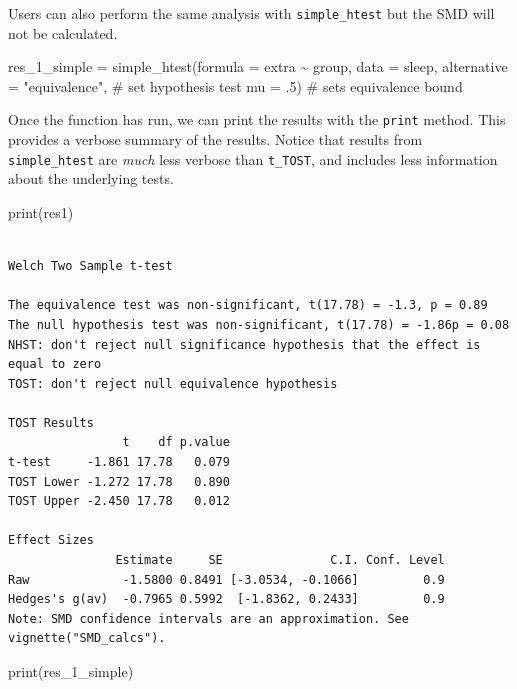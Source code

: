 \documentclass[
]{interact}
\newenvironment{Shaded}{\begin{snugshade}}{\end{snugshade}}
\newcommand{\AttributeTok}[1]{\textcolor[rgb]{0.40,0.45,0.13}{#1}}
\newcommand{\CommentTok}[1]{\textcolor[rgb]{0.37,0.37,0.37}{#1}}
\newcommand{\DecValTok}[1]{\textcolor[rgb]{0.68,0.00,0.00}{#1}}
\newcommand{\FunctionTok}[1]{\textcolor[rgb]{0.28,0.35,0.67}{#1}}
\newcommand{\NormalTok}[1]{\textcolor[rgb]{0.00,0.23,0.31}{#1}}
\newcommand{\OtherTok}[1]{\textcolor[rgb]{0.00,0.23,0.31}{#1}}
\newcommand{\SpecialCharTok}[1]{\textcolor[rgb]{0.37,0.37,0.37}{#1}}
\newcommand{\StringTok}[1]{\textcolor[rgb]{0.13,0.47,0.30}{#1}}
\begin{document}
Users can also perform the same analysis with \texttt{simple\_htest} but
the SMD will not be calculated.

\begin{Shaded}
\begin{Highlighting}[]
\NormalTok{res\_1\_simple }\OtherTok{=} \FunctionTok{simple\_htest}\NormalTok{(}\AttributeTok{formula =}\NormalTok{ extra }\SpecialCharTok{\textasciitilde{}}\NormalTok{ group, }
                            \AttributeTok{data =}\NormalTok{ sleep, }
                            \AttributeTok{alternative =} \StringTok{"equivalence"}\NormalTok{, }\CommentTok{\# set hypothesis test}
                            \AttributeTok{mu =}\NormalTok{ .}\DecValTok{5}\NormalTok{) }\CommentTok{\# sets equivalence bound}
\end{Highlighting}
\end{Shaded}

Once the function has run, we can print the results with the
\texttt{print} method. This provides a verbose summary of the results.
Notice that results from \texttt{simple\_htest} are \emph{much} less
verbose than \texttt{t\_TOST}, and includes less information about the
underlying tests.

\begin{Shaded}
\begin{Highlighting}[]
\FunctionTok{print}\NormalTok{(res1)}
\end{Highlighting}
\end{Shaded}

\begin{verbatim}

Welch Two Sample t-test

The equivalence test was non-significant, t(17.78) = -1.3, p = 0.89
The null hypothesis test was non-significant, t(17.78) = -1.86p = 0.08
NHST: don't reject null significance hypothesis that the effect is equal to zero 
TOST: don't reject null equivalence hypothesis

TOST Results 
                t    df p.value
t-test     -1.861 17.78   0.079
TOST Lower -1.272 17.78   0.890
TOST Upper -2.450 17.78   0.012

Effect Sizes 
               Estimate     SE               C.I. Conf. Level
Raw             -1.5800 0.8491 [-3.0534, -0.1066]         0.9
Hedges's g(av)  -0.7965 0.5992  [-1.8362, 0.2433]         0.9
Note: SMD confidence intervals are an approximation. See vignette("SMD_calcs").
\end{verbatim}

\begin{Shaded}
\begin{Highlighting}[]
\FunctionTok{print}\NormalTok{(res\_1\_simple)}
\end{Highlighting}
\end{Shaded}
\end{document}

